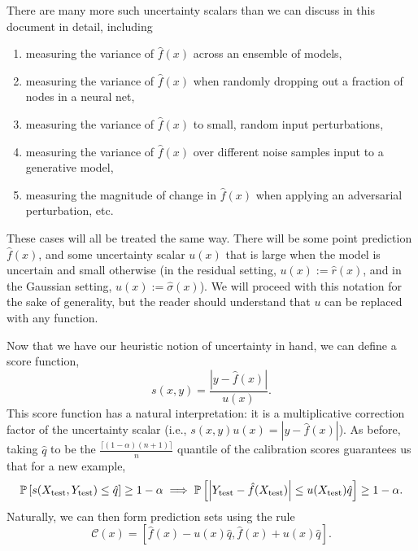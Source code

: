 \documentclass[10pt]{article}
\newcommand{\C}{\mathcal{C}}
\renewcommand{\P}{\mathbb{P}}
\begin{document}
There are many more such uncertainty scalars than we can discuss in this document in detail, including 
\begin{enumerate}
    \item measuring the variance of $\hat{f}(x)$ across an ensemble of models,
    \item measuring the variance of $\hat{f}(x)$ when randomly dropping out a fraction of nodes in a neural net,
    \item measuring the variance of $\hat{f}(x)$ to small, random input perturbations,
    \item measuring the variance of $\hat{f}(x)$ over different noise samples input to a generative model,
    \item measuring the magnitude of change in $\hat{f}(x)$ when applying an adversarial perturbation, etc.
\end{enumerate}
These cases will all be treated the same way.
There will be some point prediction $\hat{f}(x)$, and some uncertainty scalar $u(x)$ that is large when the model is uncertain and small otherwise (in the residual setting, $u(x):=\hat{r}(x)$, and in the Gaussian setting, $u(x):=\hat{\sigma}(x)$).
We will proceed with this notation for the sake of generality, but the reader should understand that $u$ can be replaced with any function.

Now that we have our heuristic notion of uncertainty in hand, we can define a score function,
\begin{equation}
\label{eq:uncertainty_scalar_score}
    s(x,y) = \frac{\left|y - \hat{f}(x)\right|}{u(x)}.
\end{equation}
This score function has a natural interpretation: it is a multiplicative correction factor of the uncertainty scalar (i.e., $s(x,y)u(x)=\left|y-\hat{f}(x)\right|$).
As before, taking $\hat{q}$ to be the $\frac{\lceil (1-\alpha)(n+1) \rceil}{n}$ quantile of the calibration scores guarantees us that for a new example,
\begin{equation}
    \P\left[s(X_{\rm test},Y_{\rm test}) \leq \hat{q} \right] \geq 1-\alpha \implies \P\left[\left|Y_{\rm test}-\hat{f}(X_{\rm test})\right| \leq u(X_{\rm test})\hat{q} \right] \geq 1-\alpha.
\end{equation}
Naturally, we can then form prediction sets using the rule
\begin{equation}
    \C(x) = \left[ \hat{f}(x) - u(x)\hat{q}, \hat{f}(x) + u(x)\hat{q} \right].
    \label{eq:us-sets}
\end{equation}
\end{document}
